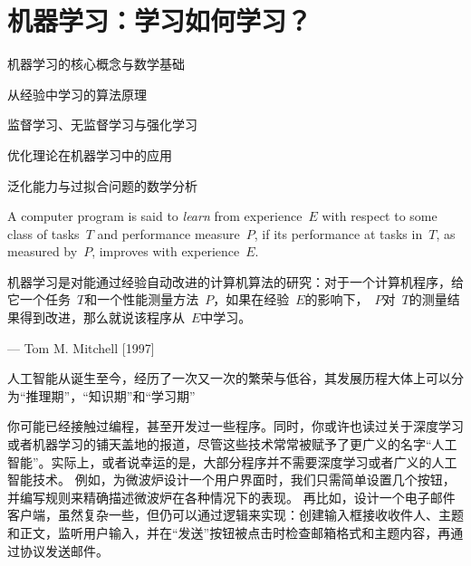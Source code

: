 
\chapter{机器学习：学习如何学习？}\label{ch:机器学习}

 \begin{introduction}
  \item 机器学习的核心概念与数学基础
  \item 从经验中学习的算法原理
  \item 监督学习、无监督学习与强化学习
  \item 优化理论在机器学习中的应用
  \item 泛化能力与过拟合问题的数学分析
\end{introduction}

A computer program is said to {\em learn} from experience~$ E$ with respect to some class of tasks~$T$ and performance measure~$P$, if its performance at tasks in~$T$, as measured by~$P$, improves with experience~$E$.

机器学习是对能通过经验自动改进的计算机算法的研究：对于一个计算机程序，给它一个任务~$T$和一个性能测量方法~$P$，如果在经验~$E$的影响下，~$P$对~$T$的测量结果得到改进，那么就说该程序从~$E$中学习。
\begin{flushright}
— Tom M. Mitchell  [1997]
\end{flushright}

人工智能从诞生至今，经历了一次又一次的繁荣与低谷，其发展历程大体上可以分为“推理期”，“知识期”和“学习期”%

%
%
%

你可能已经接触过编程，甚至开发过一些程序。同时，你或许也读过关于深度学习或者机器学习的铺天盖地的报道，尽管这些技术常常被赋予了更广义的名字“人工智能”。实际上，或者说幸运的是，大部分程序并不需要深度学习或者广义的人工智能技术。
例如，为微波炉设计一个用户界面时，我们只需简单设置几个按钮，并编写规则来精确描述微波炉在各种情况下的表现。
再比如，设计一个电子邮件客户端，虽然复杂一些，但仍可以通过逻辑来实现：创建输入框接收收件人、主题和正文，监听用户输入，并在“发送”按钮被点击时检查邮箱格式和主题内容，再通过协议发送邮件。

